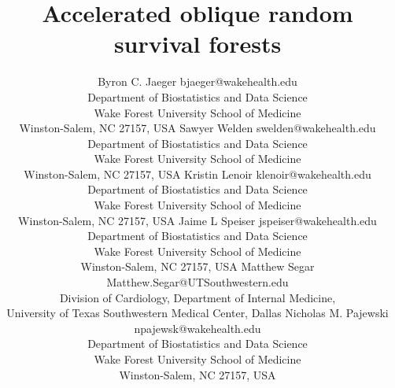 \documentclass[twoside,11pt]{article}\usepackage[]{graphicx}\usepackage[]{color}
\begin{document}
\title{Accelerated oblique random survival forests}

\author{\name Byron C. Jaeger \email bjaeger@wakehealth.edu \\
       \addr Department of Biostatistics and Data Science\\
       Wake Forest University School of Medicine\\
       Winston-Salem, NC 27157, USA
       \AND
       \name Sawyer Welden \email swelden@wakehealth.edu \\
       \addr Department of Biostatistics and Data Science\\
       Wake Forest University School of Medicine\\
       Winston-Salem, NC 27157, USA
       \AND
       \name Kristin Lenoir \email klenoir@wakehealth.edu \\
       \addr Department of Biostatistics and Data Science\\
       Wake Forest University School of Medicine\\
       Winston-Salem, NC 27157, USA
       \AND
       \name Jaime L Speiser \email jspeiser@wakehealth.edu \\
       \addr Department of Biostatistics and Data Science\\
       Wake Forest University School of Medicine\\
       Winston-Salem, NC 27157, USA
       \AND
       \name Matthew Segar \email Matthew.Segar@UTSouthwestern.edu \\
       \addr Division of Cardiology, Department of Internal Medicine, \\
       University of Texas Southwestern Medical Center, Dallas
       \AND
       \name Nicholas M. Pajewski \email npajewsk@wakehealth.edu \\
       \addr Department of Biostatistics and Data Science\\
       Wake Forest University School of Medicine\\
       Winston-Salem, NC 27157, USA}


\maketitle



\newpage
\end{document}
